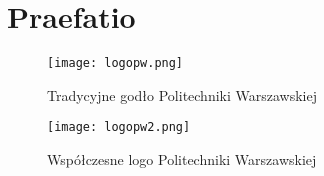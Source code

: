 \newpage %
\section{Praefatio}
\lipsum[1] \cite{Jodogne2018TheImaging}
\begin{figure}[!h]
    \label{fig:tradycyjne-logo-pw}
    \centering \texttt{[image: logopw.png]}
    \caption{Tradycyjne godło Politechniki Warszawskiej}
\end{figure}
\lipsum[2-3]
\begin{figure}[!h]
	\label{fig:nowe-logo-pw}
	\centering \texttt{[image: logopw2.png]}
	\caption{Współczesne logo Politechniki Warszawskiej}
\end{figure}
\lipsum[4-6]
